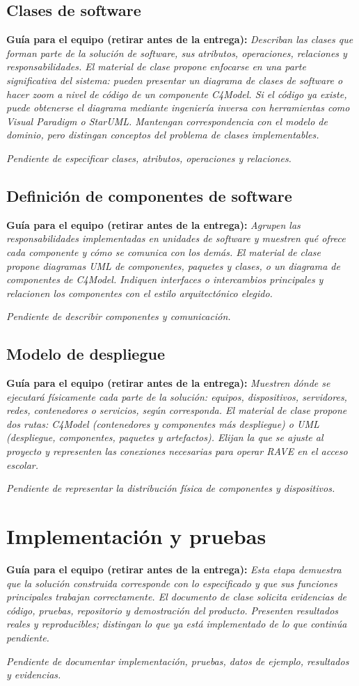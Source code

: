 \documentclass[12pt,letterpaper]{article}
\newcommand{\guia}[1]{\par\smallskip\noindent\textbf{Guía para el equipo (retirar antes de la entrega):} \textit{#1}\par\smallskip}
\begin{document}
\subsection{Clases de software}
\guia{Describan las clases que forman parte de la solución de software, sus atributos, operaciones, relaciones y responsabilidades. El material de clase propone enfocarse en una parte significativa del sistema: pueden presentar un diagrama de clases de software o hacer zoom a nivel de código de un componente C4Model. Si el código ya existe, puede obtenerse el diagrama mediante ingeniería inversa con herramientas como Visual Paradigm o StarUML. Mantengan correspondencia con el modelo de dominio, pero distingan conceptos del problema de clases implementables.}
\textit{Pendiente de especificar clases, atributos, operaciones y relaciones.}
\subsection{Definición de componentes de software}
\guia{Agrupen las responsabilidades implementadas en unidades de software y muestren qué ofrece cada componente y cómo se comunica con los demás. El material de clase propone diagramas UML de componentes, paquetes y clases, o un diagrama de componentes de C4Model. Indiquen interfaces o intercambios principales y relacionen los componentes con el estilo arquitectónico elegido.}
\textit{Pendiente de describir componentes y comunicación.}
\subsection{Modelo de despliegue}
\guia{Muestren dónde se ejecutará físicamente cada parte de la solución: equipos, dispositivos, servidores, redes, contenedores o servicios, según corresponda. El material de clase propone dos rutas: C4Model (contenedores y componentes más despliegue) o UML (despliegue, componentes, paquetes y artefactos). Elijan la que se ajuste al proyecto y representen las conexiones necesarias para operar RAVE en el acceso escolar.}
\textit{Pendiente de representar la distribución física de componentes y dispositivos.}
\section{Implementación y pruebas}
\guia{Esta etapa demuestra que la solución construida corresponde con lo especificado y que sus funciones principales trabajan correctamente. El documento de clase solicita evidencias de código, pruebas, repositorio y demostración del producto. Presenten resultados reales y reproducibles; distingan lo que ya está implementado de lo que continúa pendiente.}
\textit{Pendiente de documentar implementación, pruebas, datos de ejemplo, resultados y evidencias.}
\end{document}
